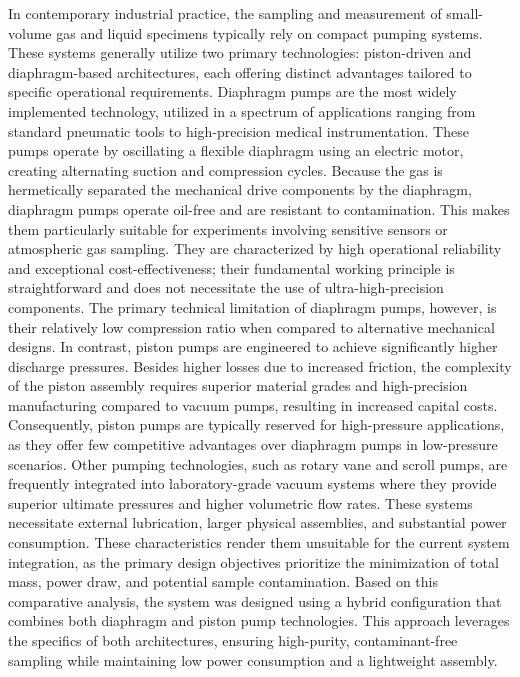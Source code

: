 In contemporary industrial practice, the sampling and measurement of small-volume gas and liquid specimens typically rely on compact pumping systems.
These systems generally utilize two primary technologies: piston-driven and diaphragm-based architectures, each offering distinct advantages tailored to specific operational requirements.
Diaphragm pumps are the most widely implemented technology, utilized in a spectrum of applications ranging from standard pneumatic tools to high-precision medical instrumentation.
These pumps operate by oscillating a flexible diaphragm using an electric motor, creating alternating suction and compression cycles.
Because the gas is hermetically separated the mechanical drive components by the diaphragm, diaphragm pumps operate oil-free and are resistant to contamination.
This makes them particularly suitable for experiments involving sensitive sensors or atmospheric gas sampling.
They are characterized by high operational reliability and exceptional cost-effectiveness; their fundamental working principle is straightforward and does not necessitate the use of ultra-high-precision components.
The primary technical limitation of diaphragm pumps, however, is their relatively low compression ratio when compared to alternative mechanical designs.
In contrast, piston pumps are engineered to achieve significantly higher discharge pressures. 
Besides higher losses due to increased friction, the complexity of the piston assembly requires superior material grades and high-precision manufacturing compared to vacuum pumps, resulting in increased capital costs.
Consequently, piston pumps are typically reserved for high-pressure applications, as they offer few competitive advantages over diaphragm pumps in low-pressure scenarios.
Other pumping technologies, such as rotary vane and scroll pumps, are frequently integrated into laboratory-grade vacuum systems where they provide superior ultimate pressures and higher volumetric flow rates.
These systems necessitate external lubrication, larger physical assemblies, and substantial power consumption.
These characteristics render them unsuitable for the current system integration, as the primary design objectives prioritize the minimization of total mass, power draw, and potential sample contamination.
Based on this comparative analysis, the system was designed using a hybrid configuration that combines both diaphragm and piston pump technologies.
This approach leverages the specifics of both architectures, ensuring high-purity, contaminant-free sampling while maintaining low power consumption and a lightweight assembly.\par 

